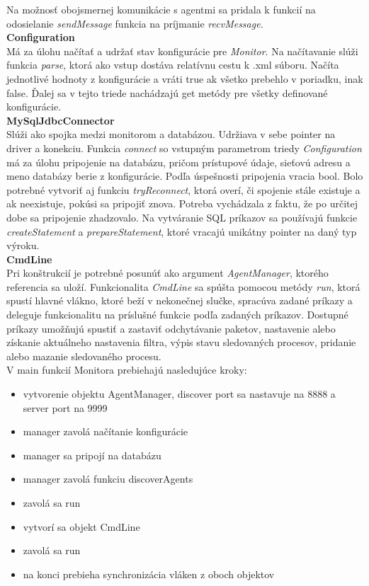 \documentclass[a4paper,12pt]{article}
\begin{document}
Na možnosť obojsmernej komunikácie s agentmi sa pridala k funkcií na odosielanie \textit{sendMessage} funkcia na príjmanie \textit{recvMessage}. \\

\textbf{Configuration} \\

Má za úlohu načítať a udržať stav konfigurácie pre \textit{Monitor}. Na načítavanie slúži funkcia \textit{parse}, ktorá ako vstup dostáva relatívnu cestu k .xml súboru. Načíta jednotlivé hodnoty z konfigurácie a vráti true ak všetko prebehlo v poriadku, inak false. Ďalej sa v tejto triede nachádzajú get metódy pre všetky definované konfigurácie. \\

\textbf{MySqlJdbcConnector} \\

Slúži ako spojka medzi monitorom a databázou. Udržiava v sebe pointer na driver a konekciu. Funkcia \textit{connect} so vstupným parametrom triedy \textit{Configuration} má za úlohu pripojenie na databázu, pričom prístupové údaje, sieťovú adresu a meno databázy berie z konfigurácie. Podľa úspešnosti pripojenia vracia bool. Bolo potrebné vytvoriť aj funkciu \textit{tryReconnect}, ktorá overí, či spojenie stále existuje a ak neexistuje, pokúsi sa pripojiť znova. Potreba vychádzala z faktu, že po určitej dobe sa pripojenie zhadzovalo. Na vytváranie SQL príkazov sa používajú funkcie \textit{createStatement} a \textit{prepareStatement}, ktoré vracajú unikátny pointer na daný typ výroku. \\

\textbf{CmdLine} \\

Pri konštrukcií je potrebné posunúť ako argument \textit{AgentManager}, ktorého referencia sa uloží. Funkcionalita \textit{CmdLine} sa spúšta pomocou metódy \textit{run}, ktorá spustí hlavné vlákno, ktoré beží v nekonečnej slučke, spracúva zadané príkazy a deleguje funkcionalitu na príslušné funkcie podľa zadaných príkazov. Dostupné príkazy umožňujú spustiť a zastaviť odchytávanie paketov, nastavenie alebo získanie aktuálneho nastavenia filtra, výpis stavu sledovaných procesov, pridanie alebo mazanie sledovaného procesu. \\

\noindent V main funkcií Monitora prebiehajú nasledujúce kroky:
\begin{itemize} 
	\item vytvorenie objektu AgentManager, discover port sa nastavuje na 8888 a server port na 9999
	\item manager zavolá načítanie konfigurácie
	\item manager sa pripojí na databázu
	\item manager zavolá funkciu discoverAgents
	\item zavolá sa run
	\item vytvorí sa objekt CmdLine
	\item zavolá sa run
	\item na konci prebieha synchronizácia vláken z oboch objektov \\
\end{itemize}
\end{document}
